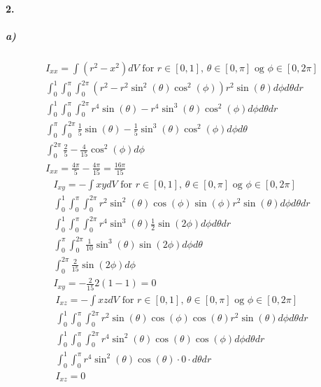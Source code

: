 \documentclass[11pt, A4paper,norsk]{article}
\begin{document}
		\paragraph{2.}
			\subparagraph{a)}
				\begin{gather*}
I_{x x} = \int (r^2 - x^2) dV \text{ for $r \in [0, 1]$, $\theta \in [0, \pi]$ og $\phi \in [0, 2 \pi]$} \\
\int_{0}^{1} \int_{0}^{\pi} \int_{0}^{2 \pi} ( r^2 - r^2 \sin^2(\theta) \cos^2(\phi) ) r^2 \sin(\theta) d\phi d\theta dr \\
\int_{0}^{1} \int_{0}^{\pi} \int_{0}^{2 \pi} r^4 \sin(\theta) - r^4 \sin^3(\theta) \cos^2(\phi) d\phi d\theta dr \\
\int_{0}^{\pi} \int_{0}^{2 \pi} \frac{1}{5} \sin(\theta) - \frac{1}{5} \sin^3(\theta) \cos^2(\phi) d\phi d\theta \\
\int_{0}^{2 \pi} \frac{2}{5} - \frac{4}{15} \cos^2(\phi) d\phi \\
I_{x x} = \frac{4 \pi}{5} - \frac{4 \pi}{15} = \frac{16 \pi}{15}
				\end{gather*}
				\begin{gather*}
I_{x y} = - \int xy dV \text{ for $r \in [0, 1]$, $\theta \in [0, \pi]$ og $\phi \in [0, 2 \pi]$} \\
\int_{0}^{1} \int_{0}^{\pi} \int_{0}^{2 \pi} r^2 \sin^2(\theta) \cos(\phi) \sin(\phi) r^2 \sin(\theta) d\phi d\theta dr \\
\int_{0}^{1} \int_{0}^{\pi} \int_{0}^{2 \pi} r^4 \sin^3(\theta) \frac{1}{2} \sin(2 \phi) d\phi d\theta dr \\
\int_{0}^{\pi} \int_{0}^{2 \pi} \frac{1}{10} \sin^3(\theta) \sin(2 \phi) d\phi d\theta \\
\int_{0}^{2 \pi} \frac{2}{15} \sin(2 \phi) d\phi \\
I_{x y} = - \frac{2}{15} 2 (1 - 1) = 0
				\end{gather*}
				\begin{gather*}
I_{x z} = - \int xz dV \text{ for $r \in [0, 1]$, $\theta \in [0, \pi]$ og $\phi \in [0, 2 \pi]$} \\
\int_{0}^{1} \int_{0}^{\pi} \int_{0}^{2 \pi} r^2 \sin(\theta) \cos(\phi) \cos(\theta) r^2 \sin(\theta) d\phi d\theta dr \\
\int_{0}^{1} \int_{0}^{\pi} \int_{0}^{2 \pi} r^4 \sin^2(\theta) \cos(\theta) \cos(\phi) d\phi d\theta dr \\
\int_{0}^{1} \int_{0}^{\pi} r^4 \sin^2(\theta) \cos(\theta) \cdot 0 \cdot d\theta dr \\
I_{x z} = 0
				\end{gather*}
\end{document}
